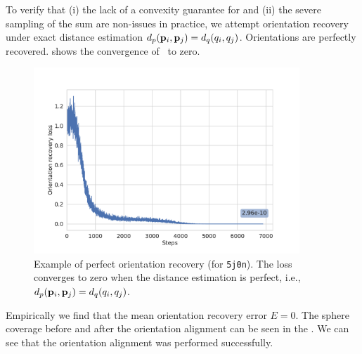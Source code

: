 
 To verify that (i) the lack of a convexity guarantee for  and (ii) the severe sampling of the sum are non-issues in practice, we attempt orientation recovery under exact distance estimation $d_p(\mathbf{p}_i, \mathbf{p}_j) = d_q(q_i, q_j)$.
Orientations are perfectly recovered.
 shows the convergence of~ to zero.

\begin{figure}[ht!]
    \centering
        \includegraphics[height=7cm]{figures/5j0n_perfect_angle_recovery}
    \caption{
        Example of perfect orientation recovery (for \texttt{5j0n}).
        The loss~ converges to zero when the distance estimation is perfect, i.e., $d_p(\mathbf{p}_i, \mathbf{p}_j) = d_q(q_i, q_j)$.
    }\label{fig:5j0n-orientation-recovery-loss}
\end{figure}

Empirically we find that the mean orientation recovery error  $E = 0$.
The sphere coverage before and after the orientation alignment can be seen in the .
We can see that the orientation alignment was performed successfully.

